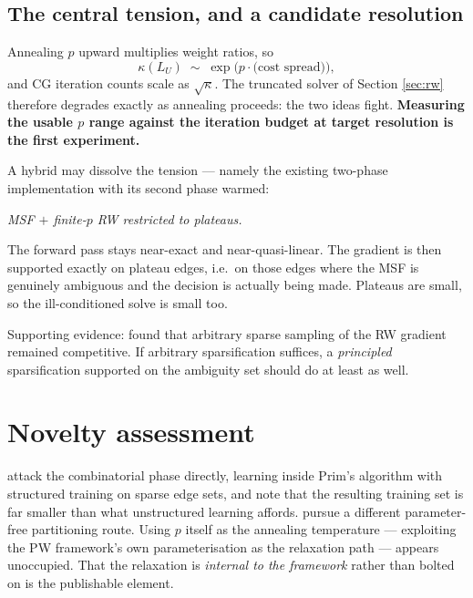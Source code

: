 \documentclass[11pt,a4paper]{article}
\newcommand{\Lap}{L}
\newcommand{\LU}{\Lap_{U}}
\theoremstyle{definition}
\begin{document}
\subsection{The central tension, and a candidate resolution}

Annealing $p$ upward multiplies weight ratios, so
\begin{equation}
  \kappa(\LU) \;\sim\; \exp\!\big(p \cdot \text{(cost spread)}\big),
\end{equation}
and CG iteration counts scale as $\sqrt{\kappa}$. The truncated solver of
Section \ref{sec:rw} therefore degrades exactly as annealing proceeds:
the two ideas fight. \textbf{Measuring the usable $p$ range against the
iteration budget at target resolution is the first experiment.}

A hybrid may dissolve the tension --- namely the existing two-phase
implementation with its second phase warmed:
\begin{center}
  \emph{MSF $+$ finite-$p$ RW restricted to plateaus.}
\end{center}
The forward pass stays near-exact and near-quasi-linear. The gradient is
then supported exactly on plateau edges, i.e.\ on those edges where the
MSF is genuinely ambiguous and the decision is actually being made.
Plateaus are small, so the ill-conditioned solve is small too.

Supporting evidence: \citet{cerrone2019learned} found that arbitrary
sparse sampling of the RW gradient remained competitive. If arbitrary
sparsification suffices, a \emph{principled} sparsification supported on
the ambiguity set should do at least as well.

\section{Novelty assessment}

\citet{wolf2017learned} attack the combinatorial phase directly, learning
inside Prim's algorithm with structured training on sparse edge sets, and
note that the resulting training set is far smaller than what
unstructured learning affords. \citet{wolf2018mutex} pursue a different
parameter-free partitioning route. Using $p$ itself as the annealing
temperature --- exploiting the PW framework's own parameterisation as the
relaxation path --- appears unoccupied. That the relaxation is
\emph{internal to the framework} rather than bolted on is the
publishable element.
\end{document}

